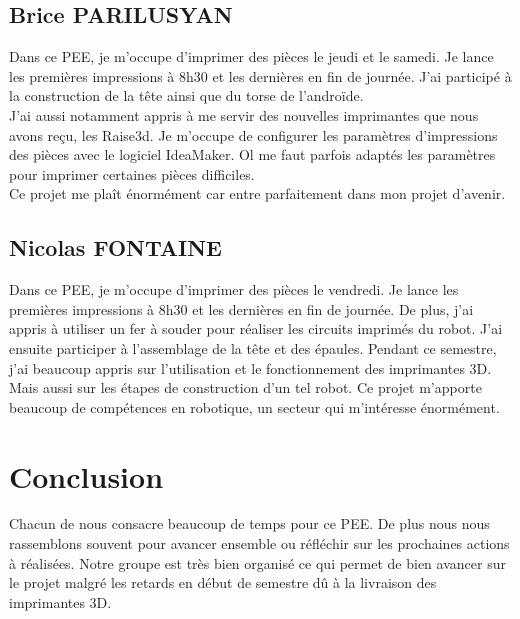 \documentclass[11pt, oneside]{article}
\begin{document}
\subsection{Brice PARILUSYAN}
\vspace{0.5cm}

Dans ce PEE, je m'occupe d'imprimer des pièces le jeudi et le samedi. Je lance les premières impressions à 8h30 et les dernières en fin de journée. J'ai participé à la construction de la tête ainsi que du torse de l'androïde. \\
J'ai aussi notamment appris à me servir des nouvelles imprimantes que nous avons reçu, les Raise3d. Je m'occupe de configurer les paramètres d'impressions des pièces avec le logiciel IdeaMaker. Ol me faut parfois adaptés les paramètres pour imprimer certaines pièces difficiles.\\
Ce projet me plaît énormément car entre parfaitement dans mon projet d'avenir.


\subsection{Nicolas FONTAINE}
\vspace{0.5cm}

Dans ce PEE, je m'occupe d'imprimer des pièces le vendredi. Je lance les premières impressions à 8h30 et les dernières en fin de journée.
De plus, j'ai appris à utiliser un fer à souder pour réaliser les circuits imprimés du robot. J'ai ensuite participer à l'assemblage de la tête et des épaules.
\newline
Pendant ce semestre, j'ai beaucoup appris sur l'utilisation et le fonctionnement des imprimantes 3D. Mais aussi sur les étapes de construction d'un tel robot.
\newline
Ce projet m'apporte beaucoup de compétences en robotique, un secteur qui m'intéresse énormément. 

\section{Conclusion}
\vspace{0.5cm}

Chacun de nous consacre beaucoup de temps pour ce PEE. De plus nous nous rassemblons souvent pour avancer ensemble ou réfléchir sur les prochaines actions à réalisées. Notre groupe est très bien organisé ce qui permet de bien avancer sur le projet malgré les retards en début de semestre dû à la livraison des imprimantes 3D.
\end{document}
